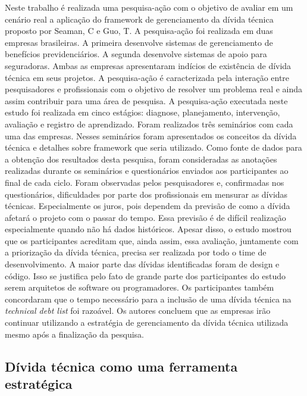 Neste trabalho\cite{oliveira2015managing} é realizada uma pesquisa-ação com o objetivo de avaliar em um cenário real a aplicação do framework de gerenciamento da dívida técnica proposto por Seaman, C e Guo, T\cite{seaman2011measuring}. A pesquisa-ação foi realizada em duas empresas brasileiras. A primeira desenvolve sistemas de gerenciamento de benefícios previdenciários. A segunda desenvolve sistemas de apoio para seguradoras. Ambas as empresas apresentaram indícios de existência de dívida técnica em seus projetos.  A pesquisa-ação é caracterizada pela interação entre pesquisadores e profissionais com o objetivo de resolver um problema real e ainda assim contribuir para uma área de pesquisa. A pesquisa-ação executada neste estudo foi realizada em cinco estágios: diagnose, planejamento, intervenção, avaliação e registro de aprendizado.  Foram realizados três seminários com cada uma das empresas. Nesses seminários foram apresentados os conceitos da dívida técnica e detalhes sobre framework que seria utilizado. 
Como fonte de dados para  a obtenção dos resultados desta pesquisa, foram consideradas as anotações realizadas durante os seminários e questionários enviados aos participantes ao final de cada ciclo.  Foram observadas pelos pesquisadores e, confirmadas nos questionários, dificuldades por parte dos profissionais em mensurar as dívidas técnicas. Especialmente os juros, pois dependem da previsão de como a dívida afetará o projeto com o passar do tempo. Essa previsão é de difícil realização especialmente quando não há dados históricos.  Apesar disso, o estudo mostrou que os participantes acreditam que, ainda assim, essa avaliação, juntamente com a priorização da dívida técnica, precisa ser realizada por todo o time de desenvolvimento.  A maior parte das dívidas identificadas foram de design e código. Isso se justifica pelo fato de grande parte dos participantes do estudo serem arquitetos de software ou programadores. Os participantes também concordaram que o tempo necessário para a  inclusão de uma dívida técnica na \textit{technical debt list} foi razoável. Os autores concluem que as empresas irão continuar utilizando a estratégia de gerenciamento da dívida técnica utilizada mesmo após a finalização da pesquisa.  

\subsection{Dívida técnica como uma ferramenta estratégica}


